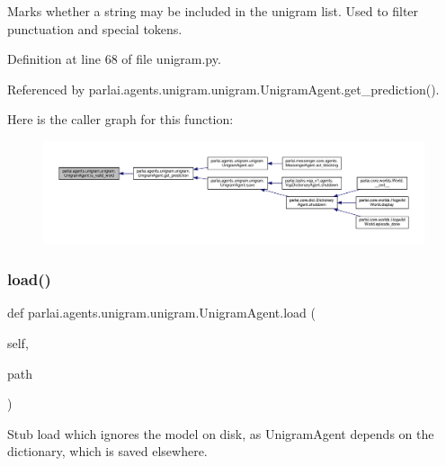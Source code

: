 \begin{DoxyVerb}Marks whether a string may be included in the unigram list. Used to
filter punctuation and special tokens.
\end{DoxyVerb}
 

Definition at line 68 of file unigram.\+py.



Referenced by parlai.\+agents.\+unigram.\+unigram.\+Unigram\+Agent.\+get\+\_\+prediction().

Here is the caller graph for this function\+:
\nopagebreak
\begin{figure}[H]
\begin{center}
\leavevmode
\includegraphics[width=350pt]{classparlai_1_1agents_1_1unigram_1_1unigram_1_1UnigramAgent_ae00fc04461f0ff1442bd894a5b574a3e_icgraph}
\end{center}
\end{figure}
\mbox{\label{classparlai_1_1agents_1_1unigram_1_1unigram_1_1UnigramAgent_a01fa26682df757201166d6f18be60da8}} 
\subsubsection{\texorpdfstring{load()}{load()}}
{\footnotesize\ttfamily def parlai.\+agents.\+unigram.\+unigram.\+Unigram\+Agent.\+load (\begin{DoxyParamCaption}\item[{}]{self,  }\item[{}]{path }\end{DoxyParamCaption})}

\begin{DoxyVerb}Stub load which ignores the model on disk, as UnigramAgent depends
on the dictionary, which is saved elsewhere.
\end{DoxyVerb}
 

